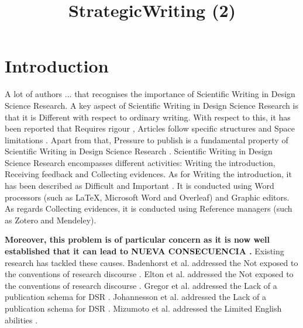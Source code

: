 \documentclass{article}
\title{StrategicWriting (2)}
\author{}
\newcommand{\todo}[1] {\iffalse #1 \fi} %
\begin{document}
\maketitle
      

\section{Introduction}

A lot of authors ... that recognises the importance of Scientific Writing in Design Science Research. A key aspect of Scientific Writing in Design Science Research is that it is Different with respect to ordinary writing. With respect to this, it has been reported that Requires rigour \cite{JohannessonAnIntroduction}, Articles follow specific structures \cite{Turbek2016} \cite{JohannessonAnIntroduction} \cite{psychologicalscience.org} \cite{Kanoksilapatham2012} and Space limitations \cite{Gregor2013} \cite{Hsu2004}. Apart from that, Pressure to publish is a fundamental property of Scientific Writing in Design Science Research \cite{CoylarBecomingwriters} \cite{Turbek2016} \cite{Sorensen1994} \cite{Kanoksilapatham2012} \cite{Mizumoto2017} \cite{Cotterall2011}. Scientific Writing in Design Science Research encompasses different activities: Writing the introduction, Receiving feedback and Collecting evidences. As for Writing the introduction, it has been described as Difficult \cite{Hsu2004} \cite{Hsu2004} \cite{Hsu2004} \cite{PeatScientificWriting.} \cite{Cotterall2011} and Important \cite{Gregor2013} \cite{Turbek2016} \cite{Turbek2016} \cite{SwalesTheWriting} \cite{Khaw2017} \cite{Kanoksilapatham2012}. It is conducted using Word processors (such as LaTeX, Microsoft Word and Overleaf) and Graphic editors. As regards Collecting evidences, it is conducted using Reference managers (such as Zotero and Mendeley). \todo{idea, esto puede ser debido al causante 1}
    

    
\textbf{ Moreover, this problem is of particular concern as it is now well established that it can lead to NUEVA CONSECUENCIA \cite{Turbek2016}. }%
Existing research has tackled these causes. Badenhorst et al. addressed the Not exposed to the conventions of research discourse \cite{Badenhorst2015}. Elton et al. addressed the Not exposed to the conventions of research discourse \cite{Elton2010}. Gregor et al. addressed the Lack of a publication schema for DSR \cite{Gregor2013}. Johannesson et al. addressed the Lack of a publication schema for DSR \cite{JohannessonAnIntroduction}. Mizumoto et al. addressed the Limited English abilities \cite{Mizumoto2017}. 
    
\end{document}
